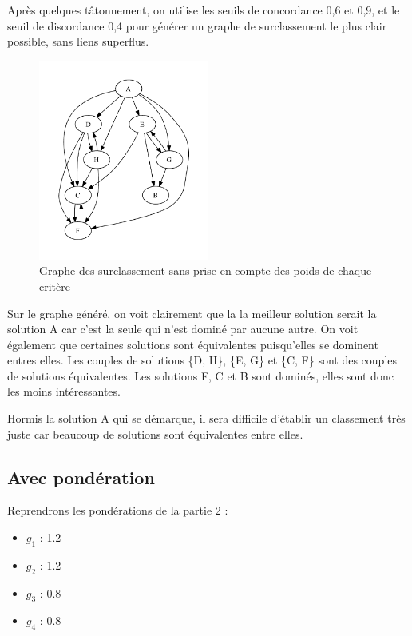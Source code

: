 Après quelques tâtonnement, on utilise les seuils de concordance 0,6 et 0,9, et le seuil de discordance 0,4 pour générer un graphe de surclassement le plus clair possible, sans liens superflus.

\clearpage

\begin{figure}[!h]
	\begin{center}
		\includegraphics[width=0.5\textwidth]{../SourcesMatlab/electre3-1.pdf}
		\caption{Graphe des surclassement sans prise en compte des poids de chaque critère}
	\end{center}
\end{figure}

Sur le graphe généré, on voit clairement que la la meilleur solution serait la
solution A car c'est la seule qui n'est dominé par aucune autre.
On voit également que certaines solutions sont équivalentes puisqu'elles se
dominent entres elles. Les couples de solutions \{D, H\}, \{E, G\} et \{C, F\}
sont des couples de solutions équivalentes.
Les solutions F, C et B sont dominés, elles sont donc les moins intéressantes.

Hormis la solution A qui se démarque, il sera difficile d'établir un classement très juste car beaucoup de solutions sont équivalentes entre elles.

\subsection{Avec pondération}
Reprendrons les pondérations de la partie 2 :
\begin{itemize}
	\item $g_1$ : 1.2
	\item $g_2$ : 1.2
	\item $g_3$ : 0.8
	\item $g_4$ : 0.8
\end{itemize}

